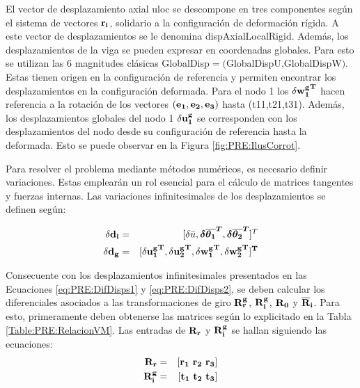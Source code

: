 El vector de desplazamiento axial \gls{uloc} se descompone en tres componentes según el sistema de vectores $\bf{r_i}$, solidario a la configuración de deformación rígida. A este vector de desplazamientos se le denomina \gls{dispAxialLocalRigid}. Además, los desplazamientos de la viga se pueden expresar en coordenadas globales.  Para esto se utilizan las 6 magnitudes clásicas \gls{GlobalDisp}$=($\gls{GlobalDispU},\gls{GlobalDispW}$)$. Estas tienen origen en la configuración de referencia y permiten encontrar los desplazamientos en la configuración deformada. Para el nodo 1 los $\bf{\delta{w_1^g}^T}$ hacen referencia a la rotación de los vectores $(\bf{e_1},\bf{e_2},\bf{e_3})$ hasta (\gls{t11},\gls{t21},\gls{t31}). Además, los desplazamientos globales del nodo 1 $\bf{\delta u_1^g}$ se corresponden con los desplazamientos del nodo desde su configuración de referencia hasta la deformada. Esto se puede observar en la Figura \ref{fig:PRE:IlusCorrot}.
%	

Para resolver el problema mediante métodos numéricos, es necesario definir variaciones. Estas emplearán un rol esencial para el cálculo de matrices tangentes y fuerzas internas. Las variaciones infinitesimales de los desplazamientos se definen según:

\begin{eqnarray}\label{eq:PRE:DifDisps1}
		\bf{\delta d_l} &=& [\delta\bar{u}, \boldsymbol{\delta\overline{ \theta _1}^T},	\boldsymbol{\delta \overline{ \theta _2}^T}]^T\\
	\label{eq:PRE:DifDisps2}
	\bf{\delta d_g} &=& [\bf{\delta u_1^g}^T, \bf{\delta u_2^g}^T, \bf{\delta{w_1^g}^T}, \bf{\delta{w_2^g}^T}]^T
\end{eqnarray}

Consecuente con los desplazamientos infinitesimales presentados en las Ecuaciones \eqref{eq:PRE:DifDisps1} y \eqref{eq:PRE:DifDisps2}, se deben calcular los diferenciales asociados a las transformaciones de giro $\bf{R_r^g}$, $\bf{R_i^g}$, $\bf{R_0}$ y $\bf{\overline{R}}_i$.
Para esto, primeramente deben obtenerse las matrices según lo explicitado en la Tabla \ref{Table:PRE:RelacionVM}. Las entradas de $\bf{R}_r$ y  $\bf{R}_i^g$ se hallan siguiendo las ecuaciones:
\begin{eqnarray}
	\label{eq:PRE:Rr}
	\bf{R_r}&=&[\bf{r_1} ~ \bf{r_2} ~ \bf{r_3}]\\
	\label{eq:PRE:Rg}
	\bf{R}_i^g&=&[\bf{t_1} ~ \bf{t_2} ~ \bf{t_3}]
\end{eqnarray}

